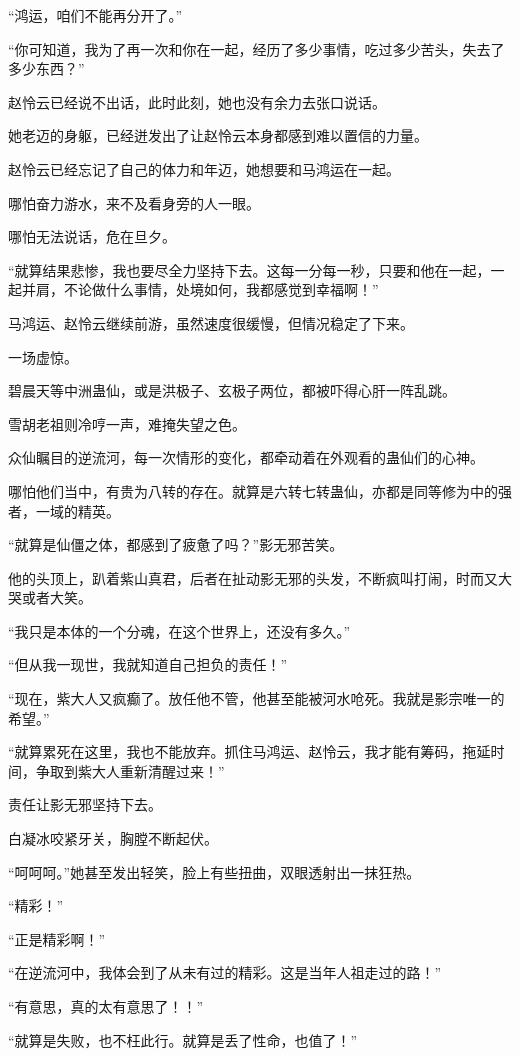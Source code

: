 \begin{this_body}
“鸿运，咱们不能再分开了。”

“你可知道，我为了再一次和你在一起，经历了多少事情，吃过多少苦头，失去了多少东西？”

赵怜云已经说不出话，此时此刻，她也没有余力去张口说话。

她老迈的身躯，已经迸发出了让赵怜云本身都感到难以置信的力量。

赵怜云已经忘记了自己的体力和年迈，她想要和马鸿运在一起。

哪怕奋力游水，来不及看身旁的人一眼。

哪怕无法说话，危在旦夕。

“就算结果悲惨，我也要尽全力坚持下去。这每一分每一秒，只要和他在一起，一起并肩，不论做什么事情，处境如何，我都感觉到幸福啊！”

马鸿运、赵怜云继续前游，虽然速度很缓慢，但情况稳定了下来。

一场虚惊。

碧晨天等中洲蛊仙，或是洪极子、玄极子两位，都被吓得心肝一阵乱跳。

雪胡老祖则冷哼一声，难掩失望之色。

众仙瞩目的逆流河，每一次情形的变化，都牵动着在外观看的蛊仙们的心神。

哪怕他们当中，有贵为八转的存在。就算是六转七转蛊仙，亦都是同等修为中的强者，一域的精英。

“就算是仙僵之体，都感到了疲惫了吗？”影无邪苦笑。

他的头顶上，趴着紫山真君，后者在扯动影无邪的头发，不断疯叫打闹，时而又大哭或者大笑。

“我只是本体的一个分魂，在这个世界上，还没有多久。”

“但从我一现世，我就知道自己担负的责任！”

“现在，紫大人又疯癫了。放任他不管，他甚至能被河水呛死。我就是影宗唯一的希望。”

“就算累死在这里，我也不能放弃。抓住马鸿运、赵怜云，我才能有筹码，拖延时间，争取到紫大人重新清醒过来！”

责任让影无邪坚持下去。

白凝冰咬紧牙关，胸膛不断起伏。

“呵呵呵。”她甚至发出轻笑，脸上有些扭曲，双眼透射出一抹狂热。

“精彩！”

“正是精彩啊！”

“在逆流河中，我体会到了从未有过的精彩。这是当年人祖走过的路！”

“有意思，真的太有意思了！！”

“就算是失败，也不枉此行。就算是丢了性命，也值了！”


\end{this_body}
